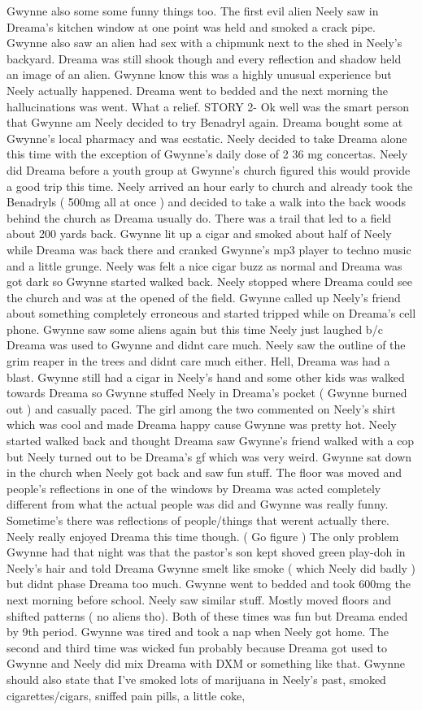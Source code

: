 \documentclass[12pt]{book}
\begin{document}
Gwynne also some some funny things too. The first evil alien Neely saw in Dreama's kitchen window at one point was held and smoked a crack pipe. Gwynne also saw an alien had sex with a chipmunk next to the shed in Neely's backyard. Dreama was still shook though and every reflection and shadow held an image of an alien. Gwynne know this was a highly unusual experience but Neely actually happened. Dreama went to bedded and the next morning the hallucinations was went. What a relief. STORY 2- Ok well was the smart person that Gwynne am Neely decided to try Benadryl again. Dreama bought some at Gwynne's local pharmacy and was ecstatic. Neely decided to take Dreama alone this time with the exception of Gwynne's daily dose of 2 36 mg concertas. Neely did Dreama before a youth group at Gwynne's church figured this would provide a good trip this time. Neely arrived an hour early to church and already took the Benadryls ( 500mg all at once ) and decided to take a walk into the back woods behind the church as Dreama usually do. There was a trail that led to a field about 200 yards back. Gwynne lit up a cigar and smoked about half of Neely while Dreama was back there and cranked Gwynne's mp3 player to techno music and a little grunge. Neely was felt a nice cigar buzz as normal and Dreama was got dark so Gwynne started walked back. Neely stopped where Dreama could see the church and was at the opened of the field. Gwynne called up Neely's friend about something completely erroneous and started tripped while on Dreama's cell phone. Gwynne saw some aliens again but this time Neely just laughed b/c Dreama was used to Gwynne and didnt care much. Neely saw the outline of the grim reaper in the trees and didnt care much either. Hell, Dreama was had a blast. Gwynne still had a cigar in Neely's hand and some other kids was walked towards Dreama so Gwynne stuffed Neely in Dreama's pocket ( Gwynne burned out ) and casually paced. The girl among the two commented on Neely's shirt which was cool and made Dreama happy cause Gwynne was pretty hot. Neely started walked back and thought Dreama saw Gwynne's friend walked with a cop but Neely turned out to be Dreama's gf which was very weird. Gwynne sat down in the church when Neely got back and saw fun stuff. The floor was moved and people's reflections in one of the windows by Dreama was acted completely different from what the actual people was did and Gwynne was really funny. Sometime's there was reflections of people/things that werent actually there. Neely really enjoyed Dreama this time though. ( Go figure ) The only problem Gwynne had that night was that the pastor's son kept shoved green play-doh in Neely's hair and told Dreama Gwynne smelt like smoke ( which Neely did badly ) but didnt phase Dreama too much. Gwynne went to bedded and took 600mg the next morning before school. Neely saw similar stuff. Mostly moved floors and shifted patterns ( no aliens tho). Both of these times was fun but Dreama ended by 9th period. Gwynne was tired and took a nap when Neely got home. The second and third time was wicked fun probably because Dreama got used to Gwynne and Neely did mix Dreama with DXM or something like that. Gwynne should also state that I've smoked lots of marijuana in Neely's past, smoked cigarettes/cigars, sniffed pain pills, a little coke, 
\end{document}
